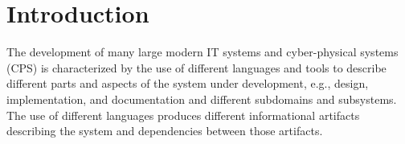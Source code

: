 
\chapter{Introduction}
\label{ch:Introduction}

The development of many large modern IT systems and cyber-physical systems (CPS) is characterized by the use of different languages and tools to describe different parts and aspects of the system under development, e.g., design, implementation, and documentation and different subdomains and subsystems. The use of different languages produces different informational artifacts describing the system and dependencies between those artifacts.

